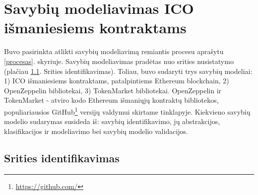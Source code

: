 \documentclass{VUMIFPSbakalaurinis}
\begin{document}



\section{Savybių modeliavimas ICO išmaniesiems kontraktams}

Buvo pasirinkta atlikti savybių modeliavimą remiantis procesu aprašytu \ref{procesas}. skyriuje. Savybių modeliavimas pradėtas nuo srities nusistatymo (plačiau \ref{sritis}. Srities identifikavimas). Toliau, buvo sudaryti trys savybių modeliai: 1) ICO išmaniesiems kontraktams, patalpintiems Ethereum blockchain, 2) OpenZeppelin bibliotekai, 3) TokenMarket bibliotekai. OpenZeppelin ir TokenMarket - atviro kodo Ethereum išmaniųjų kontraktų bibliotekos, populiariausios GitHub\footnote{\url{https://github.com/}} versijų valdymui skirtame tinklapyje. Kiekvieno savybių modelio sudarymas susideda iš: savybių identifikavimo, jų abstrakcijos, klasifikacijos ir modeliavimo bei savybių modelio validacijos.

\subsection{Srities identifikavimas} \label{sritis}
\end{document}
